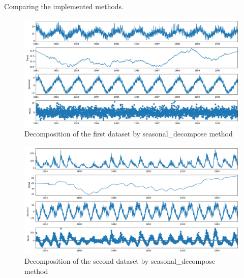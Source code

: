 \documentclass[12pt]{article}
\begin{document}
\begin{enumerate}
\begin{table}[H]
\centering
\caption{Comparing the implemented methods.
\label{tab:Ass1_comparing_methods}}

\end{table}




\begin{figure}[H]
    \centering
    \begin{minipage}[b]{1\textwidth}
        \includegraphics[width=\textwidth]{figures/Ass1/Ass1_D1_seasonal_decompose.png}
    \end{minipage}
    \caption{Decomposition of the first dataset by seasonal\_decompose method}
    \label{fig:Ass1_D1_seasonal_decompose}
\end{figure}

\begin{figure}[H]
    \centering
    \begin{minipage}[b]{1\textwidth}
        \includegraphics[width=\textwidth]{figures/Ass1/Ass1_D2_seasonal_decompose.png}
    \end{minipage}
    \caption{Decomposition of the second dataset by seasonal\_decompose method}
    \label{fig:Ass1_D2_seasonal_decompose}
\end{figure}


\end{enumerate}
\end{document}
